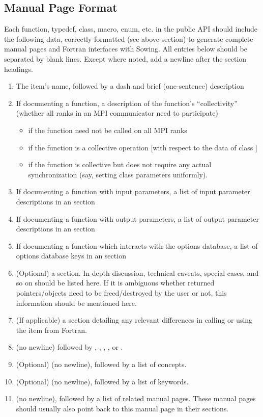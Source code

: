 \subsection{Manual Page Format}
\label{sec:manpageformat}
Each function, typedef, class, macro, enum, etc. in the public API should include the following data, correctly formatted
(see above section) to generate complete manual pages and Fortran interfaces with Sowing.
All entries below should be separated by blank lines. Except where noted, add a newline after the section headings.
\begin{enumerate}
  \item The item's name, followed by a dash and brief (one-sentence) description
  \item If documenting a function, a description of the function's ``collectivity'' (whether all ranks in an MPI communicator need to participate)
    \begin{itemize}
    \item {} if the function need not be called on all MPI ranks
    \item {} if the function is a collective operation [with respect to the data of class ]
    \item {} if the function is collective but does not require any actual synchronization (say, setting class parameters uniformly).
    \end{itemize}
  \item If documenting a function with input parameters, a list of input parameter descriptions in an  section
  \item If documenting a function with output parameters, a list of output parameter descriptions in an  section
  \item If documenting a function which interacts with the options database, a list of options database keys in an  section
  \item (Optional) a  section. In-depth discussion, technical caveats, special cases, and so on should be listed here.
    If it is ambiguous whether returned pointers/objects need to be freed/destroyed by the user or not, this information should be mentioned here.
  \item (If applicable) a  section detailing any relevant differences in calling or using the item from Fortran.
  \item \label{item:manpagelevel} (no newline) followed by , , , , or .
  \item (Optional)  (no newline), followed by a list of concepts.
  \item (Optional)  (no newline), followed by a list of keywords.
  \item {} (no newline), followed by a list of related manual pages. These manual pages should usually also point back to this manual page in their  sections.
\end{enumerate}

